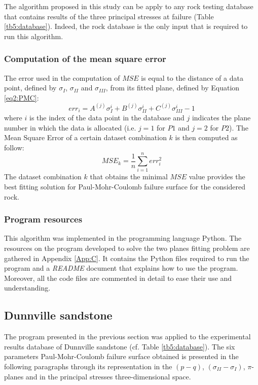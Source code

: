 The algorithm proposed in this study can be apply to any rock testing database that contains results of the three principal stresses at failure (Table \ref{tb5:database}). Indeed, the rock database is the only input that is required to run this algorithm. 

\subsubsection{Computation of the mean square error}

The error used in the computation of $MSE$ is equal to the distance of a data point, defined by $\sigma_I$, $\sigma_{II}$ and $\sigma_{III}$, from its fitted plane, defined by Equation \ref{eq2:PMC}:
\begin{equation}\label{eq5:error}
    err_{i} = A^{(j)}\sigma_I^{i}+B^{(j)}\sigma_{II}^{i}+C^{(j)}\sigma_{III}^{i} - 1
\end{equation}
where $i$ is the index of the data point in the database and $j$ indicates the plane number in which the data is allocated (i.e. $j=1$ for $P1$ and $j=2$ for $P2$). The Mean Square Error of a certain dataset combination $k$ is then computed as follow:
\begin{equation}\label{eq5:MSE}
    MSE_k = \frac{1}{n}\sum_{i=1}^{n} err_i^2
\end{equation}
The dataset combination $k$ that obtains the minimal $MSE$ value provides the best fitting solution for Paul-Mohr-Coulomb failure surface for the considered rock. 

\subsubsection{Program resources}

This algorithm was implemented in the programming language Python. The resources on the program developed to solve the two planes fitting problem are gathered in Appendix \ref{App:C}. It contains the Python files required to run the program and a \emph{README} document that explains how to use the program. Moreover, all the code files are commented in detail to ease their use and understanding.  

\subsection{Dunnville sandstone}

The program presented in the previous section was applied to the experimental results database of Dunnville sandstone (cf. Table \ref{tb5:database}). The six parameters Paul-Mohr-Coulomb failure surface obtained is presented in the following paragraphs through its representation in the $(p-q)$, $(\sigma_{II}-\sigma_I)$, $\pi$- planes and in the principal stresses three-dimensional space. 

